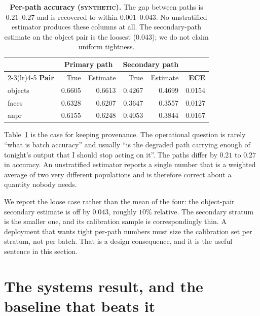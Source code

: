 \documentclass[11pt,a4paper]{article}
\newcommand{\synth}{\textsc{synthetic}}
\begin{document}
\begin{table}[t]
\centering\small
\begin{tabular}{lrrrrr}
\toprule
& \multicolumn{2}{c}{\textbf{Primary path}} & \multicolumn{2}{c}{\textbf{Secondary path}} & \\
\cmidrule(lr){2-3}\cmidrule(lr){4-5}
\textbf{Pair} & True & Estimate & True & Estimate & \textbf{ECE} \\
\midrule
objects & 0.6605 & 0.6613 & 0.4267 & 0.4699 & 0.0154 \\
faces   & 0.6328 & 0.6207 & 0.3647 & 0.3557 & 0.0127 \\
anpr    & 0.6155 & 0.6248 & 0.4053 & 0.3844 & 0.0167 \\
\bottomrule
\end{tabular}
\caption{\textbf{Per-path accuracy (\synth).} The gap between paths is
$0.21$--$0.27$ and is recovered to within $0.001$--$0.043$. No unstratified
estimator produces these columns at all. The secondary-path estimate on the object
pair is the loosest ($0.043$); we do not claim uniform tightness.}
\label{tab:perpath}
\end{table}

Table~\ref{tab:perpath} is the case for keeping provenance. The operational
question is rarely ``what is batch accuracy'' and usually ``is the degraded path
carrying enough of tonight's output that I should stop acting on it''. The paths
differ by $0.21$ to $0.27$ in accuracy. An unstratified estimator reports a single
number that is a weighted average of two very different populations and is
therefore correct about a quantity nobody needs.

We report the loose case rather than the mean of the four: the object-pair
secondary estimate is off by $0.043$, roughly $10\%$ relative. The secondary
stratum is the smaller one, and its calibration sample is correspondingly thin.
A deployment that wants tight per-path numbers must size the calibration set per
stratum, not per batch. That is a design consequence, and it is the useful
sentence in this section.

\section{The systems result, and the baseline that beats it}
\label{sec:systems}
\end{document}
